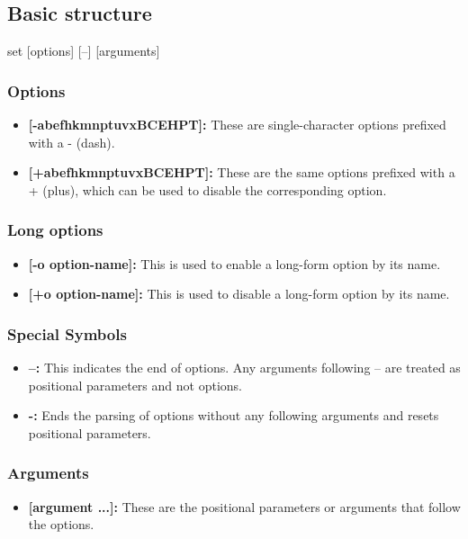 \documentclass{report}
\begin{document}
    \bigbreak \noindent 
    \subsection{Basic structure}
    \bigbreak \noindent 
    \begin{bashcode}
        set [options] [--] [arguments]
    \end{bashcode}
    \bigbreak \noindent 
    \subsubsection{Options}
    \bigbreak \noindent 
    \begin{itemize}
        \item \textbf{[-abefhkmnptuvxBCEHPT]:} These are single-character options prefixed with a - (dash).
        \item \textbf{[+abefhkmnptuvxBCEHPT]:} These are the same options prefixed with a + (plus), which can be used to disable the corresponding option.
    \end{itemize}
    \bigbreak \noindent 
    \subsubsection{Long options}
    \begin{itemize}
        \item \textbf{[-o option-name]:} This is used to enable a long-form option by its name.
        \item \textbf{[+o option-name]:} This is used to disable a long-form option by its name.
    \end{itemize}
    \bigbreak \noindent 
    \subsubsection{Special Symbols}
    \begin{itemize}
        \item \textbf{--:} This indicates the end of options. Any arguments following -- are treated as positional parameters and not options.
        \item \textbf{-:} Ends the parsing of options without any following arguments and resets positional parameters.
    \end{itemize}
    \bigbreak \noindent 
    \subsubsection{Arguments}
    \begin{itemize}
        \item \textbf{[argument ...]:} These are the positional parameters or arguments that follow the options.
    \end{itemize}
    \bigbreak \noindent 
\end{document}
